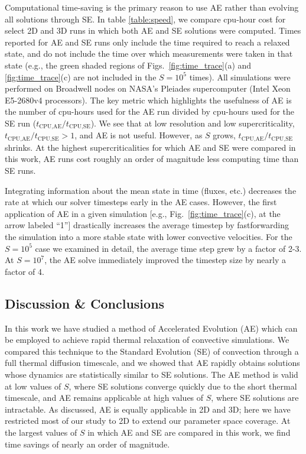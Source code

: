 Computational time-saving is the primary reason to use AE rather than evolving all solutions through SE.
In table \ref{table:speed}, we compare cpu-hour cost for select 2D and 3D runs in which both AE and SE solutions were computed. 
Times reported for AE and SE runs only include the time required to reach a relaxed state, and do not include the time over which measurements were taken in that state (e.g., the green shaded regions of Figs.~\ref{fig:time_trace}(a) and \ref{fig:time_trace}(c) are not included in the $S = 10^5$ times).
All simulations were performed on Broadwell nodes on NASA's Pleiades supercomputer (Intel Xeon E5-2680v4 processors). The key metric which highlights the usefulness of AE is the number of cpu-hours used for the AE run divided by cpu-hours used for the SE run ($t_{\text{CPU,AE}}/t_{\text{CPU,SE}}$). 
We see that at low resolution and low supercriticality, $t_{\text{CPU,AE}}/t_{\text{CPU,SE}} > 1$, and AE is not useful. However, as $S$ grows, $t_{\text{CPU,AE}}/t_{\text{CPU,SE}}$ shrinks. 
At the highest supercriticalities for which AE and SE were compared in this work, AE runs cost roughly an order of magnitude less computing time than SE runs.

Integrating information about the mean state in time (fluxes, etc.) decreases the rate at which our solver timesteps early in the AE cases. 
However, the first application of AE in a given simulation [e.g., Fig.~\ref{fig:time_trace}(c), at the arrow labeled ``1''] drastically increases the average timestep by fastforwarding the simulation into a more stable state with lower convective velocities. 
For the $S = 10^5$ case we examined in detail, the average time step grew by a factor of 2-3.
At $S = 10^7$, the AE solve immediately improved the timestep size by nearly a factor of 4.



\subsection{Discussion \& Conclusions}
\label{sec:abo18_extensions}
In this work we have studied a method of Accelerated Evolution (AE) which can be employed to achieve rapid thermal relaxation of convective simulations.  
We compared this technique to the Standard Evolution (SE) of convection through a full thermal diffusion timescale, and we showed that AE rapidly obtains solutions whose dynamics are statistically similar to SE solutions.
The AE method is valid at low values of $S$, where SE solutions converge quickly due to the short thermal timescale, and AE remains applicable at high values of $S$, where SE solutions are intractable.
As discussed, AE is equally applicable in 2D and 3D; here we have restricted most of our study to 2D to extend our parameter space coverage.
At the largest values of $S$ in which AE and SE are compared in this work, we find time savings of nearly an order of magnitude. 

